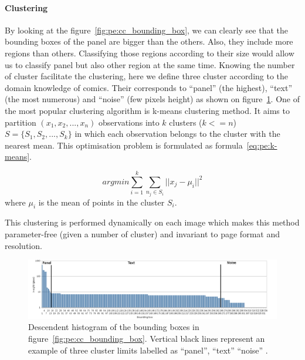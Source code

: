 \paragraph{Clustering} %
\label{par:clustering}
By looking at the figure~\ref{fig:pe:cc_bounding_box}, we can clearly see that the bounding boxes of the panel are bigger than the others.
Also, they include more regions than others.
Classifying those regions according to their size would allow us to classify panel but also other region at the same time.
Knowing the number of cluster facilitate the clustering, here 
we define three cluster according to the domain knowledge of comics.
Their corresponds to ``panel'' (the highest), ``text'' (the most numerous) and ``noise'' (few pixels height) as shown on figure~\ref{fig:pe:histo_roi}.
One of the most popular clustering algorithm is k-means clustering method.
It aims to partition $(x_1, x_2, ...,x_n)$ observations into $k$ clusters ($k <= n$) $S=\{S_1, S_2, ..., S_k\}$ in which each observation belongs to the cluster with the nearest mean.
This optimisation problem is formulated as formula~\ref{eq:pe:k-means}.

\begin{equation}
	arg min \sum\limits_{i=1}^k \sum\limits_{n_j \in S_i} ||x_j - \mu_i||^2
	\label{eq:pe:k-means}
\end{equation}
where $\mu_i$ is the mean of points in the cluster $S_i$.

This clustering is performed dynamically on each image which makes this method parameter-free (given a number of cluster) and invariant to page format and resolution.

	\begin{figure}[!ht]	%
	  \centering
		\includegraphics[width=1.0\textwidth]{Histogram_en.png}
		\caption{Descendent histogram of the bounding boxes in figure~\ref{fig:pe:cc_bounding_box}. Vertical black lines represent an example of three cluster limits labelled as ``panel'', ``text'' ``noise'' .}
		\label{fig:pe:histo_roi}
	\end{figure}

